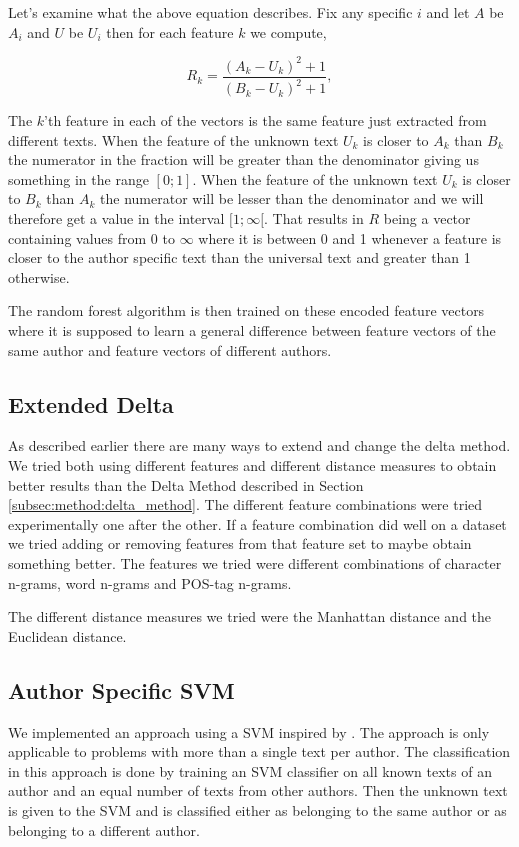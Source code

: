 Let's examine what the above equation describes. Fix any specific $i$ and let
$A$ be $A_i$ and $U$ be $U_i$ then for each feature $k$ we compute,

\begin{equation}
\label{eq:rf-encode}
    R_k = \frac{(A_k-U_k)^2+1}{(B_k-U_k)^2+1},
\end{equation}

The $k$'th feature in each of the vectors is the same feature just extracted
from different texts. When the feature of the unknown text $U_k$ is closer to
$A_k$ than $B_k$ the numerator in the fraction will be greater than the
denominator giving us something in the range $[0; 1]$. When the feature of the
unknown text $U_k$ is closer to $B_k$ than $A_k$ the numerator will be lesser
than the denominator and we will therefore get a value in the interval
$[1; \infty[$. That results in $R$ being a vector containing values from 0 to
$\infty$ where it is between 0 and 1 whenever a feature is closer to the author
specific text than the universal text and greater than 1 otherwise.

The random forest algorithm is then trained on these encoded feature vectors
where it is supposed to learn a general difference between feature vectors of
the same author and feature vectors of different authors.

\subsection{Extended Delta} \label{subsec:method:extended_delta}
As described earlier there are many ways to extend and change the delta
method. We tried both using different features and different distance
measures to obtain better results than the Delta Method described in Section
\ref{subsec:method:delta_method}. The different feature combinations were tried
experimentally one after the other. If a feature combination did well on a
dataset we tried adding or removing features from that feature set to maybe
obtain something better. The features we tried were different combinations of
character n-grams, word n-grams and \gls{POS}-tag n-grams.

The different distance measures we tried were the Manhattan distance and the
Euclidean distance.


\subsection{Author Specific SVM} \label{subsec:method:author_specific_svm}
We implemented an approach using a \gls{SVM} inspired by \cite{hansen2014}. The
approach is only applicable to problems with more than a single text per author.
The classification in this approach is done by training an \gls{SVM} classifier
on all known texts of an author and an equal number of texts from other authors.
Then the unknown text is given to the \gls{SVM} and is classified either as
belonging to the same author or as belonging to a different author.

